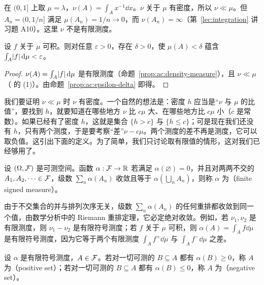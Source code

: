\begin{example}[有限性不能去掉]
在 $(0,1]$ 上取 $\mu=\lambda$，$\nu(A)=\int_Ax^{-1}\dd x$。$\nu$ 关于 $\mu$ 有密度，所以 $\nu\ll\mu$。但 $A_n=(0,1/n]$ 满足 $\mu(A_n)=1/n\to0$，而 $\nu(A_n)=\infty$（第~\ref{lec:integration} 讲习题 A10）。这里 $\nu$ 不是有限测度。
\end{example}

\begin{corollary}[积分的绝对连续性]\label{cor:ac:integral-ac}
设 $f$ 关于 $\mu$ 可积。则对任意 $\varepsilon>0$，存在 $\delta>0$，使 $\mu(A)<\delta$ 蕴含 $\int_A\lvert f\rvert\,\mathrm{d}\mu<\varepsilon$。
\end{corollary}
\begin{proof}
$\nu(A)=\int_A\lvert f\rvert\,\mathrm{d}\mu$ 是有限测度（命题~\ref{prop:ac:density-measure}），且 $\nu\ll\mu$（ 的 (1)）。由命题~\ref{prop:ac:epsilon-delta} 即得。
\end{proof}


我们要证明 $\nu\ll\mu$ 时 $\nu$ 有密度。一个自然的想法是：密度 $h$ 应当是“$\nu$ 与 $\mu$ 的比值”，要找到 $h$，就要知道在哪些地方 $\nu$ 比 $c\mu$ 大、在哪些地方比 $c\mu$ 小（$c$ 是常数）。如果已经有了密度 $h$，这就是集合 $\{h>c\}$ 与 $\{h\leqslant c\}$；可是现在我们还没有 $h$，只有两个测度，于是要考察“差”$\nu-c\mu$。两个测度的差不再是测度，它可以取负值。这引出下面的定义。为了简单，我们只讨论取有限值的情形，这对我们已经够用了。

\begin{definition}[有限符号测度]\label{def:ac:signed}
设 $(\Omega,\mathcal{F})$ 是可测空间。函数 $\alpha:\mathcal{F}\to\mathbb{R}$ 若满足 $\alpha(\varnothing)=0$，并且对两两不交的 $A_1,A_2,\dots\in\mathcal{F}$，级数 $\sum_n\alpha(A_n)$ 收敛且等于 $\alpha(\bigcup_nA_n)$，则称 $\alpha$ 为（finite signed measure）。
\end{definition}

由于不交集合的并与排列次序无关，级数 $\sum_n\alpha(A_n)$ 的任何重排都收敛到同一个值，由数学分析中的 Riemann 重排定理，它必定绝对收敛。例如，若 $\nu_1,\nu_2$ 是有限测度，则 $\nu_1-\nu_2$ 是有限符号测度；若 $f$ 关于 $\mu$ 可积，则 $\alpha(A)=\int_Af\dd\mu$ 是有限符号测度，因为它等于两个有限测度 $\int_Af^+\dd\mu$ 与 $\int_Af^-\dd\mu$ 之差。

\begin{definition}[正集，负集]
设 $\alpha$ 是有限符号测度，$A\in\mathcal{F}$。若对一切可测的 $B\subseteq A$ 都有 $\alpha(B)\geqslant0$，称 $A$ 为（positive set）；若对一切可测的 $B\subseteq A$ 都有 $\alpha(B)\leqslant0$，称 $A$ 为（negative set）。
\end{definition}

